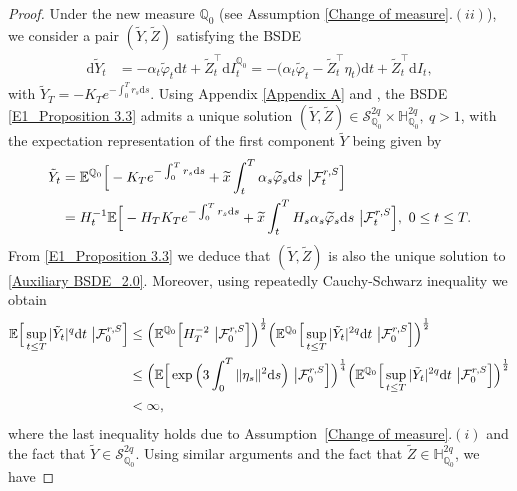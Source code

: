 \documentclass[12,reqno]{amsart}
\numberwithin{equation}{section}
\begin{document}
\begin{proof}
	Under the new measure $\mathbb{Q}_{0}$ (see Assumption \ref{Change of measure}$.(ii)$), we consider a pair $(\tilde{Y},\tilde{Z})$ satisfying the BSDE
	\begin{align}
		\mathrm{d}\tilde{Y}_{t}&=-\alpha_{t}\widetilde{\varphi}_{t}\mathrm{d}t+\tilde{Z}_{t}^{\top}\mathrm{d}I_{t}^{\mathbb{Q}_{0}}=-\Big(\alpha_{t}\widetilde{\varphi}_{t}-\tilde{Z}_{t}^{\top}\eta_{t}\Big)\mathrm{d}t+\tilde{Z}_{t}^{\top}\mathrm{d}I_{t},\label{E1_Proposition 3.3}
	\end{align}
	with $\tilde{Y}_{T}=-K_{T}e^{-\int_{0}^{T}r_{s}\mathrm{d}s}$. Using Appendix \ref{Appendix A} and \cite[Thm.~5.1]{el1997backward}, the BSDE \eqref{E1_Proposition 3.3} admits a unique solution $(\tilde{Y},\tilde{Z})\in{\mathcal{S}_{\mathbb{Q}_{0}}^{2q}}\times\mathbb{H}_{\mathbb{Q}_{0}}^{2q},~{q>1}$, with the expectation representation of the first component $\tilde{Y}$ being given by
	\begin{align}\label{E2_Proposition 3.3}
		\tilde{Y}_{t}&=\mathbb{E}^{\mathbb{Q}_{0}}\Big[-K_{T}e^{-\int_{0}^{T}r_{s}\mathrm{d}s}+\widetilde{x}\int_{t}^{T}\alpha_{s}\widetilde{\varphi}_{s}\mathrm{d}s~\big|\mathcal{F}_{t}^{r,S}\Big]\notag\\
		&=H_{t}^{-1}\mathbb{E}\Big[-H_{T}K_{T}e^{-\int_{0}^{T}r_{s}\mathrm{d}s}+\widetilde{x}\int_{t}^{T}H_{s}\alpha_{s}\widetilde{\varphi}_{s}\mathrm{d}s~\big|\mathcal{F}_{t}^{r,S}\Big],~0\le t\le T.
	\end{align}
	From \eqref{E1_Proposition 3.3} we deduce that $(\tilde{Y},\tilde{Z})$ is also the unique solution to \eqref{Auxiliary BSDE_2.0}. Moreover, using  repeatedly Cauchy-Schwarz inequality we obtain
	\begin{align*}
		\mathbb{E}\Big[\sup_{t\le T}|\tilde{Y}_{t}|^{q}\mathrm{d}t~\big|\mathcal{F}_{0}^{r,S}\Big]
		&\le\Big(\mathbb{E}^{\mathbb{Q}_{0}}\Big[H_{T}^{-2}~\big|\mathcal{F}_{0}^{r,S}\Big]\Big)^{\frac{1}{2}}\Big(\mathbb{E}^{\mathbb{Q}_{0}}\Big[\sup_{t\le T}|\tilde{Y}_{t}|^{2q}\mathrm{d}t~\big|\mathcal{F}_{0}^{r,S}\Big]\Big)^{\frac{1}{2}}\notag\\
		&\le\Big(\mathbb{E}\Big[\exp\Big(3\int_{0}^{T}\|\eta_{s}\|^{2}\mathrm{d}s\Big)~\big|\mathcal{F}_{0}^{r,S}\Big]\Big)^{\frac{1}{4}}\Big(\mathbb{E}^{\mathbb{Q}_{0}}\Big[\sup_{t\le T}|\tilde{Y}_{t}|^{2q}\mathrm{d}t~\big|\mathcal{F}_{0}^{r,S}\Big]\Big)^{\frac{1}{2}}\notag\\
		&<\infty,
	\end{align*}
	where the last inequality holds due to Assumption~\ref{Change of measure}$.(i)$ and the fact that $\tilde{Y}\in{\mathcal{S}_{\mathbb{Q}_{0}}^{2q}}$. Using similar arguments and the fact that $\tilde{Z}\in\mathbb{H}_{\mathbb{Q}_{0}}^{2q}$, we have

\end{proof}
\end{document}
